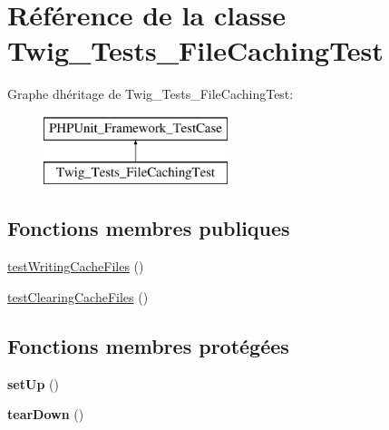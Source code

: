 \hypertarget{class_twig___tests___file_caching_test}{}\section{Référence de la classe Twig\+\_\+\+Tests\+\_\+\+File\+Caching\+Test}
\label{class_twig___tests___file_caching_test}
Graphe d\textquotesingle{}héritage de Twig\+\_\+\+Tests\+\_\+\+File\+Caching\+Test\+:\begin{figure}[H]
\begin{center}
\leavevmode
\includegraphics[height=2.000000cm]{class_twig___tests___file_caching_test}
\end{center}
\end{figure}
\subsection*{Fonctions membres publiques}
\begin{DoxyCompactItemize}
\item 
\hyperlink{class_twig___tests___file_caching_test_aefbcdcae614070c385c5f27f0b54003a}{test\+Writing\+Cache\+Files} ()
\item 
\hyperlink{class_twig___tests___file_caching_test_aa2d3825f5ddddf71efa189d95db1c7b5}{test\+Clearing\+Cache\+Files} ()
\end{DoxyCompactItemize}
\subsection*{Fonctions membres protégées}
\begin{DoxyCompactItemize}
\item 
{\bfseries set\+Up} ()\hypertarget{class_twig___tests___file_caching_test_a0bc688732d2b3b162ffebaf7812e78da}{}\label{class_twig___tests___file_caching_test_a0bc688732d2b3b162ffebaf7812e78da}

\item 
{\bfseries tear\+Down} ()\hypertarget{class_twig___tests___file_caching_test_a80fe3d17e658907fc75346a0ec9d6fc7}{}\label{class_twig___tests___file_caching_test_a80fe3d17e658907fc75346a0ec9d6fc7}

\end{DoxyCompactItemize}


